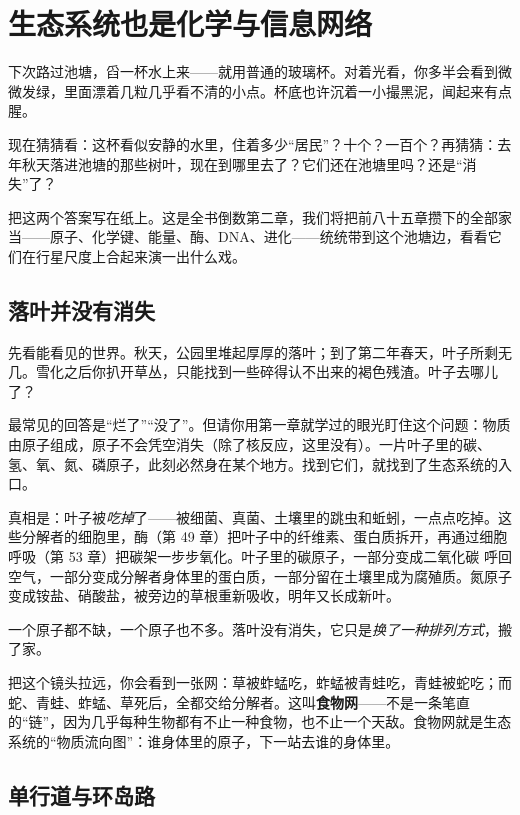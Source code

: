 \chapter{生态系统也是化学与信息网络}

\begin{kaichang}
下次路过池塘，舀一杯水上来——就用普通的玻璃杯。对着光看，你多半会看到微微发绿，里面漂着几粒几乎看不清的小点。杯底也许沉着一小撮黑泥，闻起来有点腥。

现在猜猜看：这杯看似安静的水里，住着多少“居民”？十个？一百个？再猜猜：去年秋天落进池塘的那些树叶，现在到哪里去了？它们还在池塘里吗？还是“消失”了？

把这两个答案写在纸上。这是全书倒数第二章，我们将把前八十五章攒下的全部家当——原子、化学键、能量、酶、DNA、进化——统统带到这个池塘边，看看它们在行星尺度上合起来演一出什么戏。
\end{kaichang}

\section{落叶并没有消失}

先看能看见的世界。秋天，公园里堆起厚厚的落叶；到了第二年春天，叶子所剩无几。雪化之后你扒开草丛，只能找到一些碎得认不出来的褐色残渣。叶子去哪儿了？

最常见的回答是“烂了”“没了”。但请你用第一章就学过的眼光盯住这个问题：物质由原子组成，原子不会凭空消失（除了核反应，这里没有）。一片叶子里的碳、氢、氧、氮、磷原子，此刻必然身在某个地方。找到它们，就找到了生态系统的入口。

真相是：叶子被\emph{吃掉}了——被细菌、真菌、土壤里的跳虫和蚯蚓，一点点吃掉。这些分解者的细胞里，酶（第 49 章）把叶子中的纤维素、蛋白质拆开，再通过细胞呼吸（第 53 章）把碳架一步步氧化。叶子里的碳原子，一部分变成二氧化碳  呼回空气，一部分变成分解者身体里的蛋白质，一部分留在土壤里成为腐殖质。氮原子变成铵盐、硝酸盐，被旁边的草根重新吸收，明年又长成新叶。

一个原子都不缺，一个原子也不多。落叶没有消失，它只是\emph{换了一种排列方式}，搬了家。

把这个镜头拉远，你会看到一张网：草被蚱蜢吃，蚱蜢被青蛙吃，青蛙被蛇吃；而蛇、青蛙、蚱蜢、草死后，全都交给分解者。这叫\textbf{食物网}——不是一条笔直的“链”，因为几乎每种生物都有不止一种食物，也不止一个天敌。食物网就是生态系统的“物质流向图”：谁身体里的原子，下一站去谁的身体里。

\section{单行道与环岛路}

